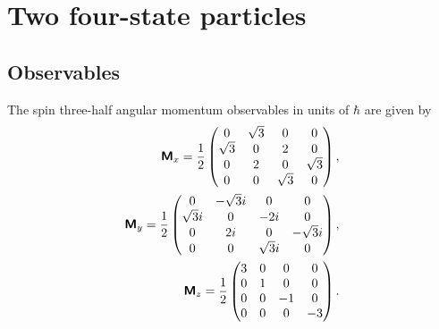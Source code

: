 

\section{Two four-state particles}


\subsection{Observables}
The spin three-half angular momentum observables in units of $\hbar$ are given by~\cite{schiff-55}
\begin{equation}
\begin{split}
\textsf{\textbf{M}}_x=
\frac{1}{2}
\begin{pmatrix}
0&\sqrt{3}&0&0\\
\sqrt{3}&0&2&0\\
0&2&0&\sqrt{3}\\
0&0&\sqrt{3}&0
\end{pmatrix}  , \\
\textsf{\textbf{M}}_y=
\frac{1}{2}
\begin{pmatrix}
0&-\sqrt{3}i&0&0\\
\sqrt{3}i&0&-2i&0\\
0&2i&0&-\sqrt{3}i\\
0&0&\sqrt{3}i&0
\end{pmatrix}   ,    \\
\textsf{\textbf{M}}_z=
\frac{1}{2}
\begin{pmatrix}
3&0&0&0\\
0&1&0&0\\
0&0&-1&0\\
0&0&0&-3
\end{pmatrix}  .
\end{split}
\end{equation}

